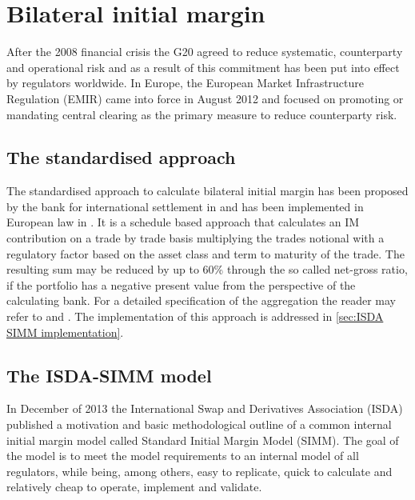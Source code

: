 \documentclass[../Thesis_AHoecherl.tex]{subfiles}
\begin{document}
    \section{Bilateral initial margin}\label{Bilateral initial margin}
    
    After the 2008 financial crisis the G20 agreed to reduce systematic, counterparty and operational risk and as a result of this commitment has been put into effect by regulators worldwide. In Europe, the European Market Infrastructure Regulation (EMIR) came into force in August 2012 and focused on promoting or mandating central clearing as the primary measure to reduce counterparty risk.

    \subsection{The standardised approach}\label{The standard approach}

    The standardised approach to calculate bilateral initial margin has been proposed by the bank for international settlement in \cite[Requirement 3.5 and 3.6]{BCBS_MarginRequirements} and has been implemented in European law in \cite{OTC_Margin_EU_Regulation}. It is a schedule based approach that calculates an \gls{IM} contribution on a trade by trade basis multiplying the trades notional with a regulatory factor based on the asset class and term to maturity of the trade.
    The resulting sum may be reduced by up to 60\% through the so called net-gross ratio, if the portfolio has a negative present value from the perspective of the calculating bank.
    For a detailed specification of the aggregation the reader may refer to \cite{BCBS_MarginRequirements} and \cite{OTC_Margin_EU_Regulation}. The implementation of this approach is addressed in \ref{sec:ISDA SIMM implementation}.
    
    \subsection{The ISDA-SIMM model}\label{sec:The ISDA-SIMM model}
    In December of 2013 the International Swap and Derivatives Association (ISDA) published a motivation and basic methodological outline of a common internal initial margin model called Standard Initial Margin Model (SIMM\texttrademark)\cite{ISDADec2013}. The goal of the model is to meet the model requirements to an internal model of all regulators, while being, among others, easy to replicate, quick to calculate and relatively cheap to operate, implement and validate.
\end{document}
